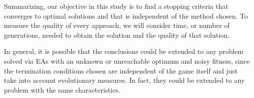 \documentclass[runningheads,a4paper]{llncs}
\begin{document}
Summarizing, our objective in this study is to find a stopping criteria that 
converges to optimal solutions 
and that is independent of the method chosen. To measure the quality of every 
approach, we will consider time, or number of generations, needed to obtain the 
solution and the quality of that solution.

In general, it is possible that the conclusions could be extended to any 
problem solved via EAs with an unknown or unreachable optimum and noisy 
fitness, since the termination conditions chosen are independent of the game 
itself and just take into account evolutionary measures. In fact, they could be 
extended to any problem with the same characteristics.

\end{document}
